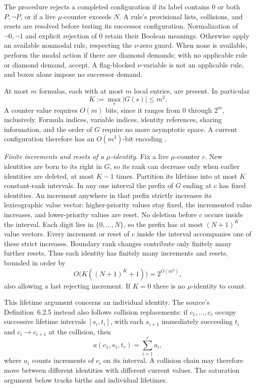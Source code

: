 The procedure rejects a completed configuration if its label
contains \(0\) or both \(P,\neg P\), or if a live
\(\mu\)-counter exceeds \(N\). A rule's provisional lists,
collisions, and resets are resolved before testing its
successor configuration.
Normalization of \(\neg0,\neg1\) and explicit
rejection of \(0\) retain their Boolean meanings.
Otherwise apply an available nonmodal rule, respecting the
\(\nu\)-zero guard. When none is available, perform the modal
action if there are diamond demands; with no applicable rule or
diamond demand, accept. A flag-blocked \(\nu\)-variable is
not an applicable rule, and boxes alone impose no successor demand.

At most \(m\) formulas, each with at most \(m\) local entries,
are present. In particular
\[
 K:=\max_s|G(s)|\leq m^2.
\]
A counter value requires \(O(m)\) bits, since it ranges from
\(0\) through \(2^m\), inclusively. Formula indices, variable
indices, identity references, sharing information, and the order of
\(G\) require no more asymptotic space. A current configuration
therefore has an \(O(m^3)\)-bit encoding
\cite[pp.~344--345]{Kozen1983}.

\emph{Finite increments and resets of a \(\mu\)-identity.}
Fix a live \(\mu\)-counter \(c\). New identities are born
to its right in \(G\), so its rank can decrease only when
earlier identities are deleted, at most \(K-1\) times.
Partition its lifetime into at most \(K\) constant-rank
intervals. In any one interval the prefix of \(G\) ending at
\(c\) has fixed identities. An increment anywhere in that
prefix strictly increases its lexicographic value vector:
higher-priority values stay fixed, the incremented value increases,
and lower-priority values are reset. No deletion before \(c\)
occurs inside the interval. Each digit lies in
\(\{0,\ldots,N\}\), so the prefix has at most
\((N+1)^K\) value vectors.
Every increment or reset of \(c\) inside the interval accompanies
one of these strict increases. Boundary rank changes contribute
only finitely many further resets. Thus each identity has finitely
many increments and resets, bounded in order by
\[
 O\bigl(K((N+1)^K+1)\bigr)=2^{O(m^3)},
\]
also allowing a last rejecting increment. If \(K=0\) there is
no \(\mu\)-identity to count.

This lifetime argument concerns an individual identity. The source's
Definition~6.2.5 instead also follows collision replacements:
if \(c_1,\ldots,c_r\) occupy successive lifetime intervals
\([s_i,t_i]\), with each \(s_{i+1}\) immediately succeeding
\(t_i\) and \(c_i\longrightarrow c_{i+1}\) at the collision,
then
\[
 a(c_1,s_1,t_r)=\sum_{i=1}^r a_i,
\]
where \(a_i\) counts increments of \(c_i\) on its interval.
A collision chain may therefore move between different
identities with different current values. The saturation
argument below tracks births and individual lifetimes.

